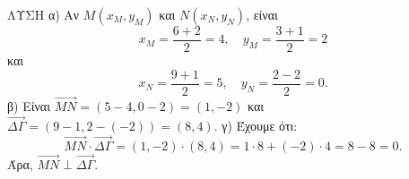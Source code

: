 ΛΥΣΗ
α) Αν $M(x_M, y_M)$ και $N(x_N, y_N)$, είναι
\[
x_M = \frac{6+2}{2} = 4, \quad y_M = \frac{3+1}{2} = 2
\]
και
\[
x_N = \frac{9+1}{2} = 5, \quad y_N = \frac{2-2}{2} = 0.
\]
β) Είναι $\vec{MN} = (5-4, 0-2) = (1,-2)$ και $\vec{\Delta\Gamma} = (9-1, 2-(-2)) = (8,4).$
γ) Έχουμε ότι:
\[
\vec{MN} \cdot \vec{\Delta\Gamma} = (1,-2) \cdot (8,4) = 1 \cdot 8 + (-2) \cdot 4 = 8 - 8 = 0.
\]
Άρα, $\vec{MN} \perp \vec{\Delta\Gamma}.$